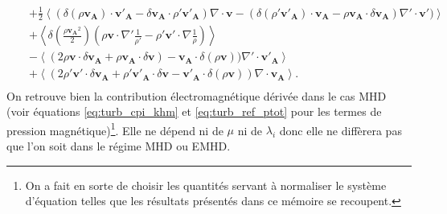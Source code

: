 \begin{eqnarray}
    &&+  \frac{1}{2}\left< (\delta( \rho\boldsymbol{v_A}) \cdot \boldsymbol{v'_{A}}-\delta \boldsymbol{v_A} \cdot \rho'\boldsymbol{v'_{A}} )  \nabla \cdot \boldsymbol{v}-  (\delta (\rho' \boldsymbol{v'_A}) \cdot \boldsymbol{v_{A}}- \rho\boldsymbol{v_A} \cdot \delta \boldsymbol{v_{A}}) \nabla' \cdot \boldsymbol{v'})\right> \nonumber\\ 
    &&+\left< \delta (\frac{\rho \boldsymbol{v_A}^2 }{2})( \rho \boldsymbol{v} \cdot \nabla'\frac{1}{\rho'}- \rho'  \boldsymbol{v'}\cdot \nabla \frac{1}{\rho}) \right> \nonumber\\ 
    &&-\left<(2\rho \boldsymbol{v}\cdot \delta \boldsymbol{v_A}+ \rho\boldsymbol{v_A}\cdot \delta \boldsymbol{v})-\boldsymbol{v_A}\cdot \delta (\rho\boldsymbol{v}))  \nabla' \cdot \boldsymbol{v'_A} \right>\nonumber\\
&&+ \left<(2\rho' \boldsymbol{v'} \cdot  \delta \boldsymbol{v_A} +\rho' \boldsymbol{v'_A} \cdot \delta \boldsymbol{v} -  \boldsymbol{v'_A} \cdot \delta (\rho\boldsymbol{v})) \nabla\cdot \boldsymbol{v_A}  \right>. \nonumber\\
\end{eqnarray}
On retrouve bien la contribution électromagnétique dérivée dans le cas \ac{MHD} (voir équations \eqref{eq:turb_cpi_khm} et \eqref{eq:turb_ref_ptot} pour les termes de pression magnétique)\footnote{On a fait en sorte de choisir les quantités servant à normaliser le système d'équation telles que les résultats présentés dans ce mémoire se recoupent.\label{fn:warning}}. Elle ne dépend ni de $\mu$ ni de $\lambda_i$ donc elle ne diffèrera pas que l'on soit dans le régime \ac{MHD} ou \acs{EMHD}. 
